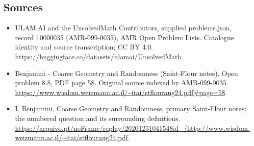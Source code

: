 \documentclass[11pt,a4paper]{article}
\begin{document}
\subsection{Sources}
\begin{itemize}
\item[S1] ULAM.AI and the UnsolvedMath Contributors, supplied problems.json, record 10000035 (AMR-099-0035), AMR Open Problem Lists. Catalogue identity and source transcription; CC BY 4.0.
\url{https://huggingface.co/datasets/ulamai/UnsolvedMath}.
\item[S2] Benjamini - Coarse Geometry and Randomness (Saint-Flour notes), Open problem 8.8, PDF page 58. Original source indexed by AMR-099-0035.
\url{https://www.wisdom.weizmann.ac.il/~itai/stflouraug24.pdf#page=58}.
\item[S3] I. Benjamini, Coarse Geometry and Randomness, primary Saint-Flour notes; the numbered question and its surrounding definitions.
\url{https://arquivo.pt/noFrame/replay/20201231041548id_/http://www.wisdom.weizmann.ac.il/~itai/stflouraug24.pdf}.
\end{itemize}
\end{document}
